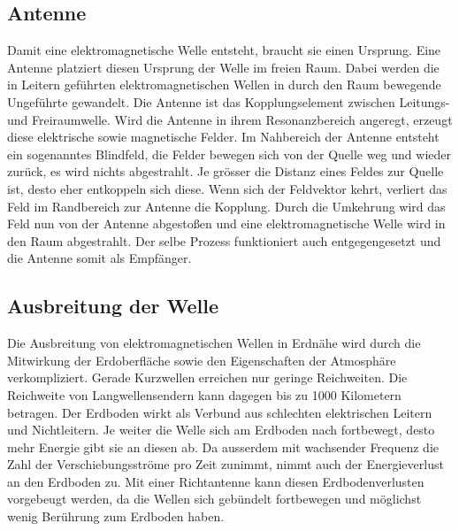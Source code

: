 \begin{refsection}
\subsection{Antenne}
Damit eine elektromagnetische Welle entsteht, braucht sie einen Ursprung.
Eine Antenne platziert diesen Ursprung der Welle im freien Raum.
Dabei werden die in Leitern geführten elektromagnetischen Wellen in durch den Raum bewegende Ungeführte gewandelt.
Die Antenne ist das Kopplungselement zwischen Leitungs- und Freiraumwelle.
Wird die Antenne in ihrem Resonanzbereich angeregt, erzeugt diese elektrische sowie magnetische Felder.
Im Nahbereich der Antenne entsteht ein sogenanntes Blindfeld, die Felder bewegen sich von der Quelle weg und wieder zurück, es wird nichts abgestrahlt.
Je grösser die Distanz eines Feldes zur Quelle ist, desto eher entkoppeln sich diese.
Wenn sich der Feldvektor kehrt, verliert das Feld im Randbereich zur Antenne die Kopplung.
Durch die Umkehrung wird das Feld nun von der Antenne abgestoßen und eine elektromagnetische Welle wird in den Raum abgestrahlt.
Der selbe Prozess funktioniert auch entgegengesetzt und die Antenne somit als Empfänger\cite{buch:unger}.

\subsection{Ausbreitung der Welle}
Die Ausbreitung von elektromagnetischen Wellen in Erdnähe wird durch die Mitwirkung der Erdoberfläche sowie den Eigenschaften der Atmosphäre verkompliziert.
Gerade Kurzwellen erreichen nur geringe Reichweiten.
Die Reichweite von Langwellensendern kann dagegen bis zu 1000 Kilometern betragen.
Der Erdboden wirkt als Verbund aus schlechten elektrischen Leitern und Nichtleitern. 
Je weiter die Welle sich am Erdboden nach fortbewegt, desto mehr Energie gibt sie an diesen ab.
Da ausserdem mit wachsender Frequenz die Zahl der Verschiebungsströme pro Zeit zunimmt, nimmt auch der Energieverlust an den Erdboden zu.
Mit einer Richtantenne kann diesen Erdbodenverlusten vorgebeugt werden, da die Wellen sich gebündelt fortbewegen und möglichst wenig Berührung zum Erdboden haben.


\end{refsection}
